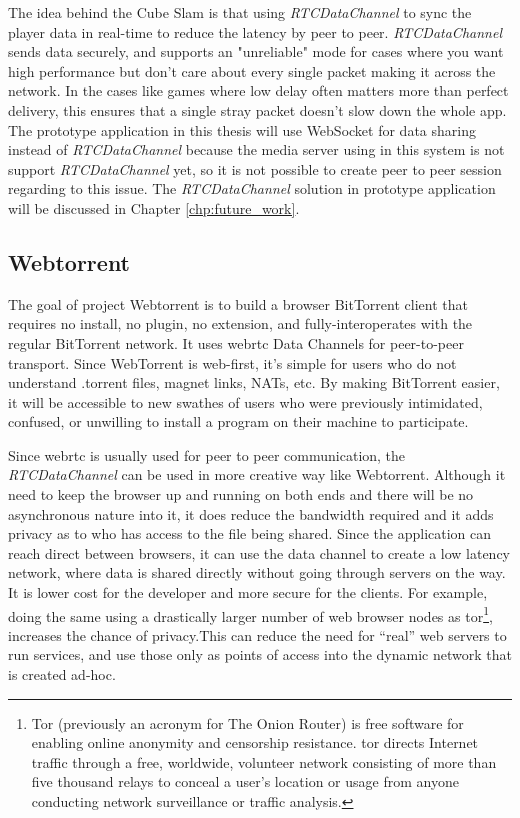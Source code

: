 \par The idea behind the Cube Slam is that using \textit{RTCDataChannel} to sync the player data in real-time to reduce the latency by peer to peer. \textit{RTCDataChannel} sends data securely, and supports an "unreliable" mode for cases where you want high performance but don't care about every single packet making it across the network. In the cases like games where low delay often matters more than perfect delivery, this ensures that a single stray packet doesn't slow down the whole app. The prototype application in this thesis will use WebSocket for data sharing instead of \textit{RTCDataChannel} because the media server using in this system is not support \textit{RTCDataChannel} yet, so it is not possible to create peer to peer session regarding to this issue. The \textit{RTCDataChannel} solution in prototype application will be discussed in Chapter \ref{chp:future_work}.

\subsection{Webtorrent}

\par The goal of project Webtorrent is to build a browser BitTorrent client that requires no install, no plugin, no extension, and fully-interoperates with the regular BitTorrent network. It uses \gls{webrtc} Data Channels for peer-to-peer transport. Since WebTorrent is web-first, it's simple for users who do not understand .torrent files, magnet links, NATs, etc. By making BitTorrent easier, it will be accessible to new swathes of users who were previously intimidated, confused, or unwilling to install a program on their machine to participate.\cite{github:webtorrent}

\par Since \gls{webrtc} is usually used for peer to peer communication, the \textit{RTCDataChannel} can be used in more creative way like Webtorrent. Although it need to keep the browser up and running on both ends and there will be no asynchronous nature into it, it does reduce the bandwidth required and it adds privacy as to who has access to the file being shared. Since the application can reach direct between browsers, it can use the data channel to create a low latency network, where data is shared directly without going through servers on the way. It is lower cost for the developer and more secure for the clients. For example, doing the same using a drastically larger number of web browser nodes as \gls{tor}\footnote{Tor (previously an acronym for The Onion Router) is free software for enabling online anonymity and censorship resistance. \gls{tor} directs Internet traffic through a free, worldwide, volunteer network consisting of more than five thousand relays to conceal a user's location or usage from anyone conducting network surveillance or traffic analysis.\cite{wiki:tor}}, increases the chance of privacy.This can reduce the need for “real” web servers to run services, and use those only as points of access into the dynamic network that is created ad-hoc.

